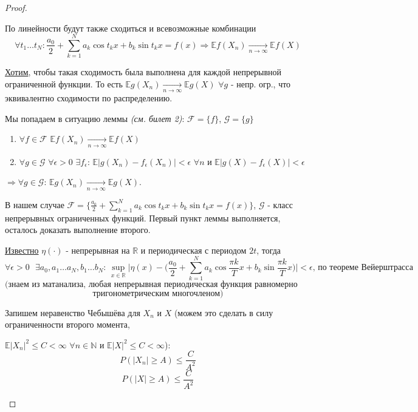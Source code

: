 \begin{proof}
\begin{itemize}
        По линейности будут также сходиться и всевозможные комбинации
        $$\forall t_1 \ldots t_N: \frac{a_0}{2} + \sum_{k = 1}^{N} a_k\cos{t_kx} + b_k\sin{t_kx} = f(x) \Rightarrow \mathbb{E}f(X_n) \xrightarrow[n \rightarrow \infty]{} \mathbb{E}f(X)$$
        
        \underline{Хотим}, чтобы такая сходимость была выполнена для каждой непрерывной ограниченной функции. То есть $\mathbb{E}g(X_n) \xrightarrow[n \rightarrow \infty]{} \mathbb{E}g(X)$ $\forall g$ - непр. огр., что эквивалентно сходимости по распределению.
        
        Мы попадаем в ситуацию леммы \textit{(см. билет 2)}: $\mathcal{F} = \{f\}$, $\mathcal{G} = \{g\}$
        \begin{enumerate}
            \item $\forall f \in \mathcal{F}$ $\mathbb{E}f(X_n) \xrightarrow[n \rightarrow \infty]{} \mathbb{E}f(X)$
            \item $\forall g \in \mathcal{G}$ $\forall \epsilon > 0$ $\exists f_{\epsilon}$: $\mathbb{E}|g(X_n) - f_{\epsilon}(X_n)| < \epsilon$ $\forall n$ и $\mathbb{E}|g(X) - f_{\epsilon}(X)| < \epsilon$
        \end{enumerate}
        $\Rightarrow \forall g \in \mathcal{G}$: $\mathbb{E}g(X_n) \xrightarrow[n \rightarrow \infty]{} \mathbb{E}g(X)$.
        
        В нашем случае $\mathcal{F} = \Big\{ \frac{a_0}{2} + \sum_{k = 1}^{N} a_k\cos{t_kx} + b_k\sin{t_kx} = f(x) \Big\}$, $\mathcal{G}$ - класс непрерывных ограниченных функций. Первый пункт леммы выполняется, осталось доказать выполнение второго.
        
        \underline{Известно} $\eta(\cdot)$ - непрерывная на $\mathbb{R}$ и периодическая с периодом $2t$, тогда
        $$\forall \epsilon > 0 \textrm{ } \exists a_0, a_1 \ldots a_N, b_1 \ldots b_N \textrm{: } \sup_{x \in \mathbb{R}}\Big|\eta(x) - \Big(\frac{a_0}{2} + \sum_{k = 1}^{N}a_k\cos{\frac{\pi k}{T}x} + b_k\sin{\frac{\pi k}{T}x} \Big) \Big| < \epsilon \textrm{, по теореме Вейерштрасса}$$
        $$\textrm{(знаем из матанализа, любая непрерывная периодическая функция равномерно приближается }$$
        $$\textrm{тригонометрическим многочленом)}$$
        
        Запишем неравенство Чебышёва для $X_n$ и $X$ (можем это сделать в силу ограниченности второго момента,
        
        $\mathbb{E}|X_n|^2 \leq C < \infty$ $\forall n \in \mathbb{N}$ и $\mathbb{E}|X|^2 \leq C < \infty$):
        $$P(|X_n| \geq A) \leq \frac{C}{A^2}$$
        $$P(|X| \geq A) \leq \frac{C}{A^2}$$
        

\end{itemize}
\end{proof}
